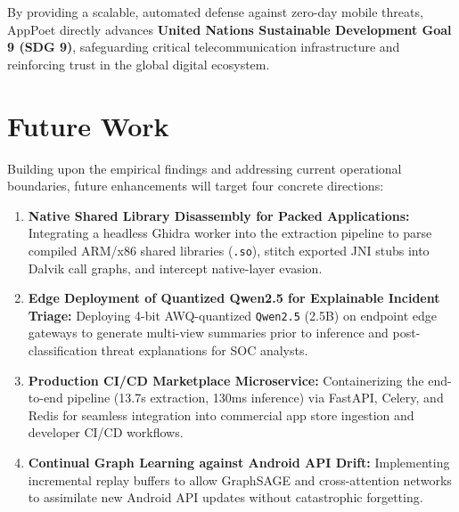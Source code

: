 \documentclass[12pt,a4paper,oneside]{report}
\begin{document}
By providing a scalable, automated defense against zero-day mobile threats, AppPoet directly advances \textbf{United Nations Sustainable Development Goal 9 (SDG 9)}, safeguarding critical telecommunication infrastructure and reinforcing trust in the global digital ecosystem.

\section{Future Work}
Building upon the empirical findings and addressing current operational boundaries, future enhancements will target four concrete directions:
\begin{enumerate}
    \item \textbf{Native Shared Library Disassembly for Packed Applications:} Integrating a headless Ghidra worker into the extraction pipeline to parse compiled ARM/x86 shared libraries (\texttt{.so}), stitch exported JNI stubs into Dalvik call graphs, and intercept native-layer evasion.
    \item \textbf{Edge Deployment of Quantized Qwen2.5 for Explainable Incident Triage:} Deploying 4-bit AWQ-quantized \texttt{Qwen2.5} (2.5B) on endpoint edge gateways to generate multi-view summaries prior to inference and post-classification threat explanations for SOC analysts.
    \item \textbf{Production CI/CD Marketplace Microservice:} Containerizing the end-to-end pipeline (13.7s extraction, 130ms inference) via FastAPI, Celery, and Redis for seamless integration into commercial app store ingestion and developer CI/CD workflows.
    \item \textbf{Continual Graph Learning against Android API Drift:} Implementing incremental replay buffers to allow GraphSAGE and cross-attention networks to assimilate new Android API updates without catastrophic forgetting.
\end{enumerate}

\clearpage
\renewcommand{\bibname}{References}
\end{document}
